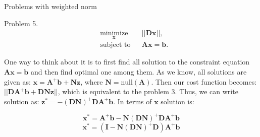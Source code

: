 \documentclass{beamer}
\begin{document}
\begin{frame}{Problems with weighted norm}
	\begin{flushleft}
		
		Problem 5. 
		\begin{equation}
			\begin{aligned}
				& \underset{\mathbf{x}}{\text{minimize}}
				& & || \mathbf{D}\mathbf{x} ||, \\
				& \text{subject to}
				& & \mathbf{A} \mathbf{x} = \mathbf{b}.
			\end{aligned}
		\end{equation}
		
		One way to think about it is to first find all solution to the constraint equation $\mathbf{A} \mathbf{x} = \mathbf{b}$ and then find optimal one among them. As we know, all solutions are given as: $\mathbf{x} = \mathbf{A}^+\mathbf{b} + \mathbf{N}\mathbf{z}$, where $\mathbf{N} = \text{null}(\mathbf{A})$. Then our cost function becomes: $|| \mathbf{D}\mathbf{A}^+\mathbf{b} +  \mathbf{D}\mathbf{N}\mathbf{z} ||$, which is equivalent to the problem 3. Thus, we can write solution as: 
		$\mathbf{z}^* = -(\mathbf{D}\mathbf{N})^+ \mathbf{D}\mathbf{A}^+\mathbf{b}$. In terms of $\mathbf{x}$ solution is:
		
		\begin{equation}
			\mathbf{x}^* = \mathbf{A}^+\mathbf{b}-\mathbf{N}(\mathbf{D}\mathbf{N})^+ \mathbf{D}\mathbf{A}^+\mathbf{b}
		\end{equation}
		\begin{equation}
			\mathbf{x}^* =( \mathbf{I}-\mathbf{N}(\mathbf{D}\mathbf{N})^+ \mathbf{D})\mathbf{A}^+\mathbf{b}
		\end{equation}
		
	\end{flushleft}
\end{frame}
\end{document}

